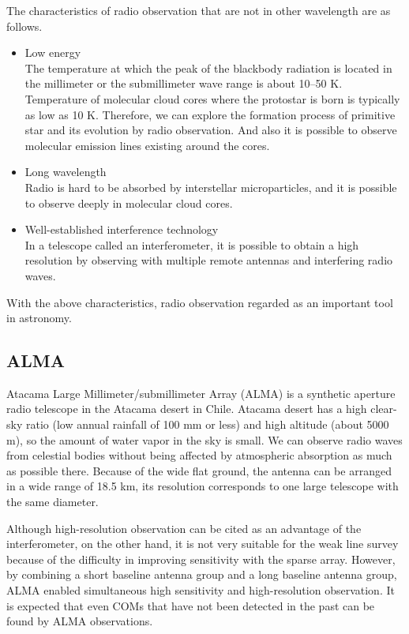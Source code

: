 The characteristics of radio observation that are not in other wavelength are as follows.\begin{itemize}
\item Low energy\\
The temperature at which the peak of the blackbody radiation is located in the millimeter or the submillimeter wave range is about 10--50 K.
Temperature of molecular cloud cores where the protostar is born is typically as low as 10 K. 
Therefore, we can explore the formation process of primitive star and its evolution by radio observation. 
And also it is possible to observe molecular emission lines existing around the cores.

\item Long wavelength\\
Radio is hard to be absorbed by interstellar microparticles, and it is possible to observe deeply in molecular cloud cores.

\item Well-established interference technology\\
In a telescope called an interferometer, it is possible to obtain a high resolution by observing 
with multiple remote antennas and interfering radio waves. 
\end{itemize}

With the above characteristics, radio observation regarded as an important tool in astronomy.

\subsection{ALMA}
Atacama Large Millimeter/submillimeter Array (ALMA) is a synthetic aperture radio telescope 
in the Atacama desert in Chile.
Atacama desert has a high clear-sky ratio (low annual rainfall of 100 mm or less) and 
high altitude (about 5000 m), so the amount of water vapor in the sky is small. 
We can observe radio waves from celestial bodies without being affected by atmospheric 
absorption as much as possible there.
Because of the wide flat ground, the antenna can be arranged in a wide range of 18.5 km, 
its resolution corresponds to one large telescope with the same diameter.

Although high-resolution observation can be cited as an advantage of the interferometer, 
on the other hand, it is not very suitable for the weak line survey because of the difficulty in improving sensitivity with the sparse array. 
However, by combining a short baseline antenna group and a long baseline antenna group,
ALMA enabled simultaneous high sensitivity and high-resolution observation. 
It is expected that even COMs that have not been detected in the past can be found by ALMA observations.

